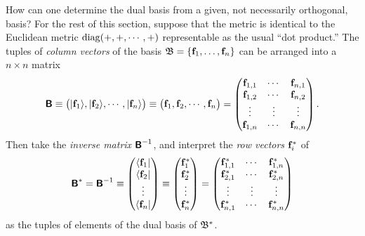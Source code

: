 How can one determine the dual basis from a given,
not necessarily orthogonal, basis?
For the rest of this section, suppose that the metric is identical to the Euclidean metric ${\rm diag}(+,+,\cdots ,+)$ representable as the usual ``dot product.''
The tuples of {\em column vectors} of the basis ${\frak B} = \{{\bf f}_1,\ldots , {\bf f}_n\}$
can be arranged into a $n \times n$ matrix
\begin{equation}
\textsf{\textbf{B}}
\equiv
\begin{pmatrix} \vert {\bf f}_{1} \rangle , \vert {\bf f}_{2}\rangle , \cdots ,\vert  {\bf f}_{n}\rangle \end{pmatrix}
\equiv
\begin{pmatrix} {\bf f}_{1} , {\bf f}_{2}, \cdots , {\bf f}_{n} \end{pmatrix}
=
\begin{pmatrix}
{\bf f}_{1,1}&\cdots & {\bf f}_{n,1}\\
{\bf f}_{1,2}&\cdots & {\bf f}_{n,2}\\
\vdots&\vdots & \vdots \\
{\bf f}_{1,n}&\cdots & {\bf f}_{n,n}
\end{pmatrix}
.
\end{equation}
Then take the
{\em inverse matrix}
$\textsf{\textbf{B}}^{-1}$,
and interpret the
{\em row vectors} ${\bf f}_{i}^\ast$ of
\begin{equation}
\begin{split}
\textsf{\textbf{B}}^{\ast}=\textsf{\textbf{B}}^{-1}
\equiv
\begin{pmatrix}
\langle {\bf f}_{1} \vert \\
\langle {\bf f}_{2} \vert \\
                      \vdots  \\
\langle {\bf f}_{n} \vert
\end{pmatrix}
\equiv
\begin{pmatrix}
{\bf f}_{1}^\ast\\
{\bf f}_{2}^\ast\\
\vdots  \\
{\bf f}_{n}^\ast
\end{pmatrix}
=
\begin{pmatrix}
{\bf f}_{1,1}^\ast&\cdots & {\bf f}_{1,n}^\ast\\
{\bf f}_{2,1}^\ast&\cdots & {\bf f}_{2,n}^\ast\\
\vdots&\vdots & \vdots \\
{\bf f}_{n,1}^\ast&\cdots & {\bf f}_{n,n}^\ast
\end{pmatrix}
\end{split}
\end{equation}
as the tuples of elements of the dual basis of ${\frak B}^\ast $.

